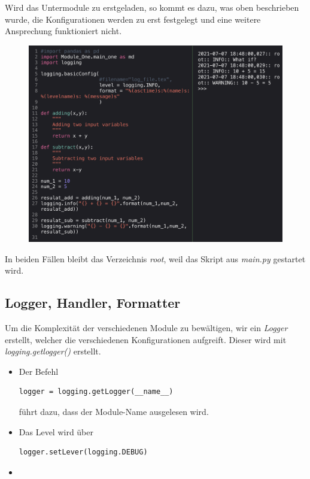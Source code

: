 Wird das Untermodule zu erstgeladen, so kommt es dazu, was oben beschrieben wurde, die Konfigurationen werden zu erst festgelegt und eine weitere Ansprechung funktioniert nicht.

\begin{figure}[H]
	\centering
	\includegraphics[scale = 0.5]{attachment/chapter_4/Scc032}
\end{figure}

In beiden Fällen bleibt das Verzeichnis \textit{root}, weil das Skript aus \textit{main.py} gestartet wird.

\subsection{Logger, Handler, Formatter}
Um die Komplexität der verschiedenen Module zu bewältigen, wir ein \textit{Logger} erstellt, welcher die verschiedenen Konfigurationen aufgreift. Dieser wird mit \textit{logging.getlogger()} erstellt. 

\begin{itemize}
	\item Der Befehl 
	\begin{lstlisting}[style=python]
		logger = logging.getLogger(__name__)
	\end{lstlisting} führt dazu, dass der Module-Name ausgelesen wird.
	\item Das Level wird über 
	\begin{lstlisting}[style=python]
		logger.setLever(logging.DEBUG)
	\end{lstlisting} 
	\item 	
\end{itemize}


